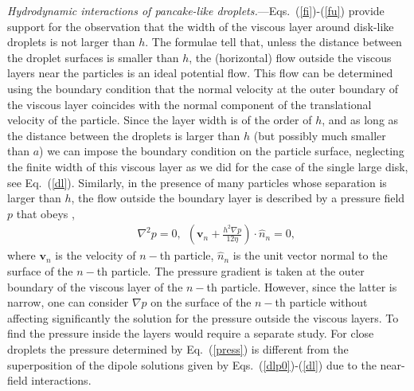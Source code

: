 {\it Hydrodynamic interactions of pancake-like droplets.}---Eqs.~(\ref{fi})-(\ref{fu}) provide support for the observation that  the width of the viscous layer around disk-like droplets is not larger than $h$.
The formulae tell that, unless the distance between the droplet surfaces is smaller than $h$, the (horizontal) flow outside the viscous layers near the particles is an
ideal potential flow. This flow can be determined using the boundary condition that the normal velocity at the outer boundary of the viscous layer coincides with the normal component of the translational velocity of the particle.
Since the layer width is of the order of $h$, and as long as the distance between the droplets is larger than $h$ (but possibly much smaller than $a$) we can impose the boundary condition on the particle surface, neglecting the finite width of this viscous layer as we did for the case of the single large disk, see Eq.~(\ref{dl}). Similarly, in the presence of many particles whose separation is larger than $h$, the flow outside the boundary layer is described by a pressure field $p$ that obeys \citep{is,tl2012},
\begin{eqnarray}&&%
\nabla^2 p=0,\ \ \left(\bm v_n+\frac{h^2\nabla p}{12\eta}\right)\cdot{\hat n}_n=0, \label{press}
\end{eqnarray}
where $\bm v_n$ is the velocity of $n-$th particle, ${\hat n}_n$ is the unit vector normal to the surface of the $n-$th particle. The pressure gradient is taken at the outer boundary of the viscous layer of the $n-$th particle. However, since the latter is narrow, one can consider $\nabla p$ on the surface of the $n-$th particle without affecting significantly the solution for the pressure outside the viscous layers. To find the pressure inside the layers would require a separate study. For close droplets the pressure determined by Eq.~(\ref{press}) is different from the superposition of the dipole solutions given by Eqs.~(\ref{dlp0})-(\ref{dl}) due to the near-field interactions.

